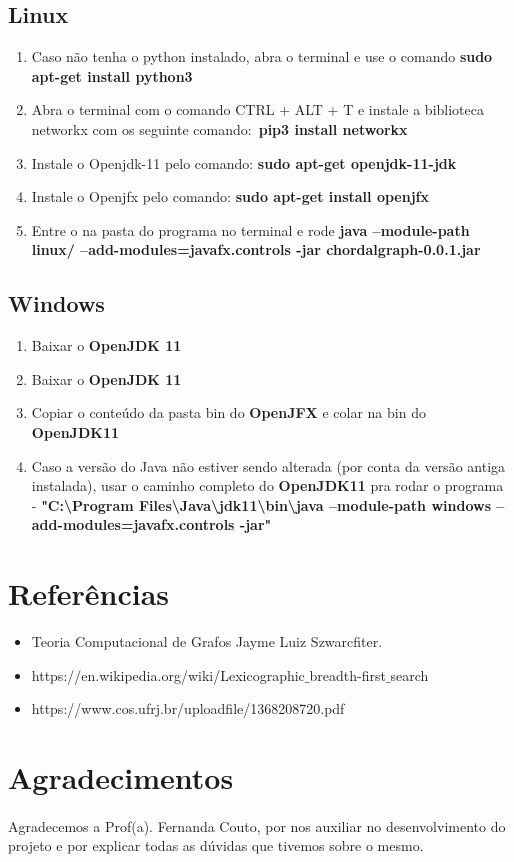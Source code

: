 \documentclass[a4paper, 11pt]{article}
\begin{document}
			
			\subsection{Linux}
				\begin{enumerate}
					
					\item Caso não tenha o python instalado, abra o terminal e use o comando \textbf{sudo apt-get install python3}
					
					\item Abra o terminal com o comando CTRL + ALT + T e instale a biblioteca networkx com os seguinte comando:\ \textbf{pip3 install networkx}
					\item Instale o Openjdk-11 pelo comando:
					\textbf{sudo apt-get openjdk-11-jdk}
					\item Instale o Openjfx pelo comando:
					\textbf{sudo apt-get install openjfx}
					\item Entre o na pasta do programa no terminal e rode \textbf{java --module-path linux/ --add-modules=javafx.controls -jar chordalgraph-0.0.1.jar}
					
				\end{enumerate}
			\subsection{Windows}
			\begin{enumerate}
				\item Baixar o \textbf{OpenJDK 11}
				\item Baixar o \textbf{OpenJDK 11}
				\item Copiar o conteúdo da pasta bin do \textbf{OpenJFX} e colar na bin do \textbf{OpenJDK11}
				\item Caso a versão do Java não estiver sendo alterada (por conta da versão antiga instalada), usar o caminho completo do \textbf{OpenJDK11} pra rodar o programa 
				- \textbf{"C:\textbackslash Program Files\textbackslash Java\textbackslash jdk11\textbackslash bin\textbackslash java --module-path windows --add-modules=javafx.controls -jar"}
			\end{enumerate}
		\section{Referências}	
			\begin{itemize}
				\item Teoria Computacional de Grafos
				Jayme Luiz Szwarcfiter.
				
				\item https://en.wikipedia.org/wiki/Lexicographic$\_$breadth-first$\_$search
				
				\item https://www.cos.ufrj.br/uploadfile/1368208720.pdf
				
			\end{itemize}
		\section{Agradecimentos}
			\paragraph{} Agradecemos a Prof(a). Fernanda Couto, por nos auxiliar no desenvolvimento do projeto e por explicar todas as dúvidas que tivemos sobre o mesmo.
\end{document}
